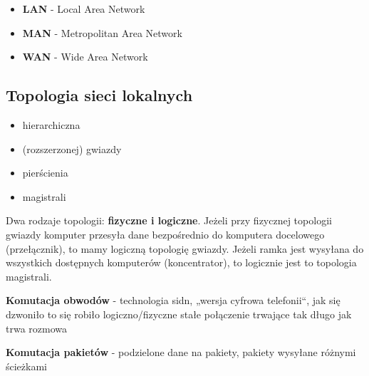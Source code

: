 \documentclass[../main.tex]{subfiles}
\begin{document}
    \begin{itemize}
        \item \textbf{LAN} - Local Area Network
        \item \textbf{MAN} - Metropolitan Area Network
        \item \textbf{WAN} - Wide Area Network
    \end{itemize}


    \subsection{Topologia sieci lokalnych}
    \begin{itemize}
        \item hierarchiczna
        \item (rozszerzonej) gwiazdy
        \item pierścienia
        \item magistrali
    \end{itemize}
    Dwa rodzaje topologii: \textbf{fizyczne i logiczne}.
    Jeżeli przy fizycznej topologii gwiazdy komputer przesyła dane bezpośrednio do komputera docelowego (przełącznik), to mamy logiczną topologię gwiazdy.
    Jeżeli ramka jest wysyłana do wszystkich dostępnych komputerów (koncentrator), to logicznie jest to topologia magistrali.

    \textbf{Komutacja obwodów} - technologia sidn, „wersja cyfrowa telefonii“, jak się dzwoniło to
    się robiło logiczno/fizyczne stałe połączenie trwające tak długo jak trwa rozmowa

    \textbf{Komutacja  pakietów} - podzielone dane na pakiety, pakiety wysyłane różnymi ścieżkami

\end{document}
